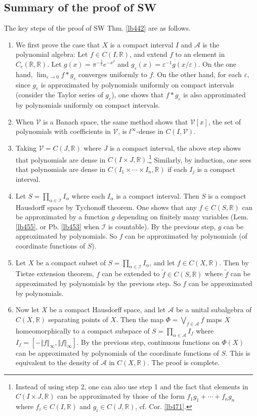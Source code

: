 \documentclass[12pt,b5paper,notitlepage]{article}
\theoremstyle{definition}
\theoremstyle{plain}
\newcommand{\mc}{\mathcal}
\newcommand{\wtd}{\widetilde}
\newcommand{\scr}{\mathscr}
\newcommand{\Rbb}{\mathbb R}
\newcommand{\eps}{\varepsilon}
\numberwithin{equation}{section}
\begin{document}
\subsection{Summary of the proof of SW}





The key steps of the proof of SW Thm. \ref{lb442} are as follows.

\begin{enumerate}
\item We first prove the case that $X$ is a compact interval $I$ and $\scr A$ is the polynomial algebra: Let $f\in C(I,\Rbb)$, and extend $f$ to an element in $C_c(\Rbb,\Rbb)$. Let $g(x)=\pi^{-\frac 12}e^{-x^2}$ and $g_\eps(x)=\eps^{-1}g(x/\eps)$. On the one hand, $\lim_{\eps\rightarrow 0}f*g_\eps$ converges uniformly to $f$. On the other hand, for each $\eps$, since $g_\eps$ is approximated by polynomials uniformly on compact intervals (consider the Taylor series of $g_\eps$), one shows that $f*g_\eps$ is also approximated by polynomials uniformly on compact intervals.  
\item When $\mc V$ is a Banach space, the same method shows that $\mc V[x]$, the set of polynomials with coefficients in $\mc V$, is $l^\infty$-dense in $C(I,\mc V)$.  
\item Taking $\mc V=C(J,\Rbb)$ where $J$ is a compact interval, the above step shows that polynomials are dense in $C(I\times J,\Rbb)$.\footnote{Instead of using step 2, one can also use step 1 and the fact that elements in $C(I\times J,\Rbb)$ can be approximated by those of the form $f_1g_1+\cdots+f_ng_n$ where $f_i\in C(I,\Rbb)$ and $g_i\in C(J,\Rbb)$, cf. Cor. \ref{lb471}.} Similarly, by induction, one sees that polynomials are dense in $C(I_1\times\cdots\times I_n,\Rbb)$ if each $I_j$ is a compact interval.
\item Let $S=\prod_{\alpha\in\scr I}I_\alpha$ where each $I_\alpha$ is a compact interval. Then $S$ is a compact Hausdorff space by Tychonoff theorem. One shows that any $f\in C(S,\Rbb)$ can be approximated by a function $g$ depending on finitely many variables (Lem. \ref{lb455}, or Pb. \ref{lb453} when $\scr I$ is countable). By the previous step, $g$ can be approximated by polynomials. So $f$ can be approximated by polynomials (of coordinate functions of $S$).
\item Let $X$ be a compact subset of $S=\prod_{\alpha\in\scr I}I_\alpha$, and let $f\in C(X,\Rbb)$. Then by Tietze extension theorem, $f$ can be extended to $\wtd f\in C(S,\Rbb)$ where $\wtd f$ can be approximated by polynomials by the previous step. So $f$ can be approximated by polynomials.
\item Now let $X$ be a compact Hausdorff space, and let $\scr A$ be a unital subalgebra of $C(X,\Rbb)$ separating points of $X$. Then the map $\Phi=\bigvee_{f\in\scr A}f$ maps $X$ homeomorphically to a compact subspace of $S=\prod_{\alpha\in\scr A}I_f$ where $I_f=[-\Vert f\Vert_\infty,\Vert f\Vert_\infty]$. By the previous step, continuous functions on $\Phi(X)$ can be approximated by polynomials of the coordinate functions of $S$. This is equivalent to the density of $\scr A$ in $C(X,\Rbb)$. The proof is complete.
\end{enumerate}
\end{document}
